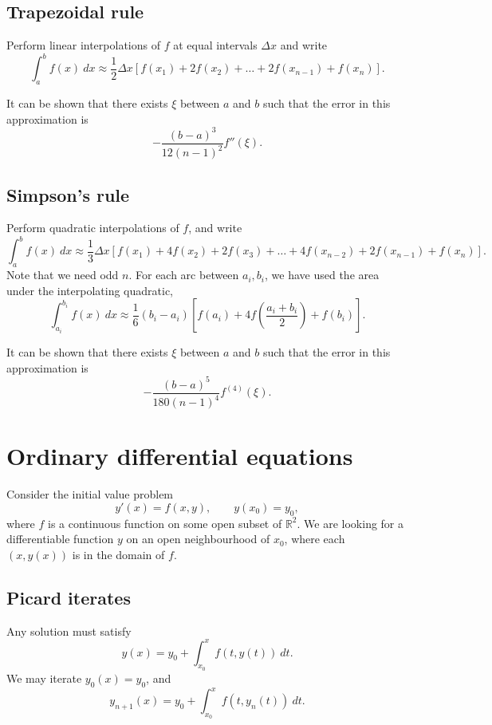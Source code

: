 \documentclass[11pt]{article}
\newcommand{\R}{\mathbb{R}}
\theoremstyle{definition}
\theoremstyle{remark}
\numberwithin{equation}{section}
\begin{document}
    \subsection{Trapezoidal rule}
    Perform linear interpolations of $f$ at equal intervals $\Delta x$ and write \[
        \int_a^b f(x)\:dx \approx \frac{1}{2}\Delta x \left[f(x_1) + 2f(x_2) + \dots
        + 2f(x_{n - 1}) + f(x_n)\right].
    \] 

    It can be shown that there exists $\xi$ between $a$ and $b$ such that the error
    in this approximation is \[
        -\frac{(b - a)^3}{12(n - 1)^2} f''(\xi).
    \] 
    
    \subsection{Simpson's rule}
    Perform quadratic interpolations of $f$, and write \[
        \int_a^b f(x)\:dx \approx \frac{1}{3}\Delta x \left[f(x_1) + 4f(x_2) +
        2f(x_3) + \dots + 4f(x_{n - 2}) + 2f(x_{n - 1}) + f(x_n)\right].
    \] Note that we need odd $n$. For each arc between $a_i, b_i$, we have used the
    area under the interpolating quadratic, \[
        \int_{a_i}^{b_i} f(x)\:dx \approx \frac{1}{6}(b_i - a_i) \left[f(a_i) +
        4f\left(\frac{a_i + b_i}{2}\right) + f(b_i)\right].
    \] 
    
    It can be shown that there exists $\xi$ between $a$ and $b$ such that the error
    in this approximation is \[
        -\frac{(b - a)^5}{180(n - 1)^4} f^{(4)}(\xi).
    \] 



    \section{Ordinary differential equations}

    Consider the initial value problem \[
        y'(x) = f(x, y), \qquad y(x_0) = y_0,
    \] where $f$ is a continuous function on some open subset of $\R^2$. We are
    looking for a differentiable function $y$ on an open neighbourhood of $x_0$,
    where each $(x, y(x))$ is in the domain of $f$.

    \subsection{Picard iterates}
    Any solution must satisfy \[
        y(x) = y_0 + \int_{x_0}^x f(t, y(t))\:dt.
    \] We may iterate $y_0(x) = y_0$, and \[
        y_{n + 1}(x) = y_0 + \int_{x_0}^x f(t, y_n(t))\:dt.
    \] 
\end{document}
